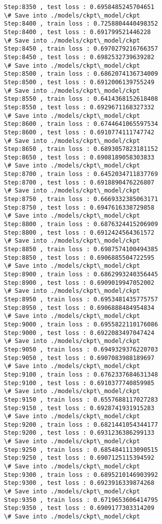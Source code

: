 \documentclass[11pt]{article}
\begin{document}
\begin{Verbatim}[commandchars=\\\{\}]
Step:8350 , test loss : 0.6958485245704651
\# Save into ./models/ckpt\_model/ckpt
Step:8400 , train loss : 0.7258804440498352
Step:8400 , test loss : 0.691799521446228
\# Save into ./models/ckpt\_model/ckpt
Step:8450 , train loss : 0.6970279216766357
Step:8450 , test loss : 0.6982532739639282
\# Save into ./models/ckpt\_model/ckpt
Step:8500 , train loss : 0.6862074136734009
Step:8500 , test loss : 0.6912006139755249
\# Save into ./models/ckpt\_model/ckpt
Step:8550 , train loss : 0.6414368152618408
Step:8550 , test loss : 0.6929671168327332
\# Save into ./models/ckpt\_model/ckpt
Step:8600 , train loss : 0.6744641065597534
Step:8600 , test loss : 0.6910774111747742
\# Save into ./models/ckpt\_model/ckpt
Step:8650 , train loss : 0.6893057823181152
Step:8650 , test loss : 0.6908189058303833
\# Save into ./models/ckpt\_model/ckpt
Step:8700 , train loss : 0.6452034711837769
Step:8700 , test loss : 0.6918890476226807
\# Save into ./models/ckpt\_model/ckpt
Step:8750 , train loss : 0.6669332385063171
Step:8750 , test loss : 0.6947616338729858
\# Save into ./models/ckpt\_model/ckpt
Step:8800 , train loss : 0.6876324415206909
Step:8800 , test loss : 0.6912424564361572
\# Save into ./models/ckpt\_model/ckpt
Step:8850 , train loss : 0.6987574100494385
Step:8850 , test loss : 0.6906885504722595
\# Save into ./models/ckpt\_model/ckpt
Step:8900 , train loss : 0.6862993240356445
Step:8900 , test loss : 0.6909019947052002
\# Save into ./models/ckpt\_model/ckpt
Step:8950 , train loss : 0.6953481435775757
Step:8950 , test loss : 0.6906888484954834
\# Save into ./models/ckpt\_model/ckpt
Step:9000 , train loss : 0.6955822110176086
Step:9000 , test loss : 0.6922083497047424
\# Save into ./models/ckpt\_model/ckpt
Step:9050 , train loss : 0.6949329376220703
Step:9050 , test loss : 0.6907083988189697
\# Save into ./models/ckpt\_model/ckpt
Step:9100 , train loss : 0.6762337684631348
Step:9100 , test loss : 0.6910377740859985
\# Save into ./models/ckpt\_model/ckpt
Step:9150 , train loss : 0.6557688117027283
Step:9150 , test loss : 0.6928741931915283
\# Save into ./models/ckpt\_model/ckpt
Step:9200 , train loss : 0.6821441054344177
Step:9200 , test loss : 0.6931236386299133
\# Save into ./models/ckpt\_model/ckpt
Step:9250 , train loss : 0.6854841113090515
Step:9250 , test loss : 0.6907125115394592
\# Save into ./models/ckpt\_model/ckpt
Step:9300 , train loss : 0.6895210146903992
Step:9300 , test loss : 0.6923916339874268
\# Save into ./models/ckpt\_model/ckpt
Step:9350 , train loss : 0.6719653606414795
Step:9350 , test loss : 0.6909177303314209
\# Save into ./models/ckpt\_model/ckpt

\end{Verbatim}
\end{document}
